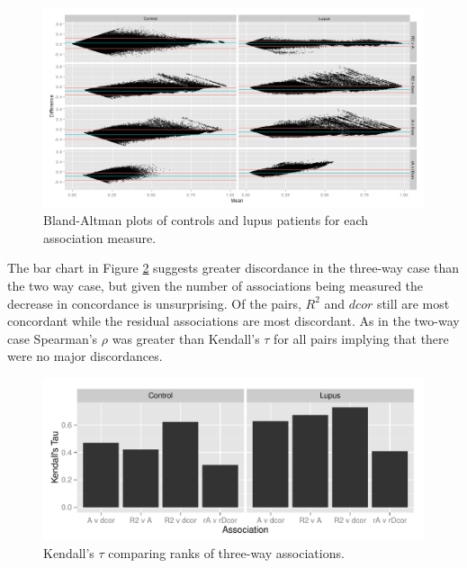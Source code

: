 \documentclass[a4paper, 12pt]{report}
\begin{document}
\begin{figure}[H]
\begin{centering}
\includegraphics[width=\textwidth]{3wayBA.png}
\caption{Bland-Altman plots of controls and lupus patients for each association measure.} 
\label{F:3wayBA}
\end{centering}
\end{figure}

The bar chart in Figure \ref{F:3wayKendall} suggests greater discordance in the three-way case than the two way case, but given the number of associations being measured the decrease in concordance is unsurprising. Of the pairs, $R^2$ and $dcor$ still are most concordant while the residual associations are most discordant. As in the two-way case Spearman's $\rho$ was greater than Kendall's $\tau$ for all pairs implying that there were no major discordances.

\begin{figure}[H]
\begin{centering}
\includegraphics[width=\textwidth]{3wayKendall.pdf}
\caption{Kendall's $\tau$ comparing ranks of three-way associations.} 
\label{F:3wayKendall}
\end{centering}
\end{figure}
\end{document}
